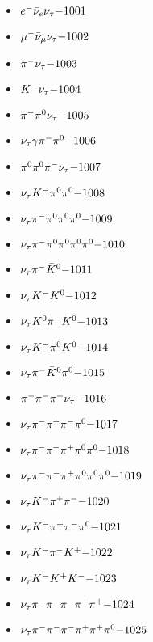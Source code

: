 
 \begin{multicols}{3} 
 \begin{itemize}
 \item $ e^{-} \bar{\nu}_{e} \nu_{\tau} \hfill{-1001}$
 \item $ \mu^{-} \bar{\nu}_{\mu} \nu_{\tau} \hfill{-1002}$
 \item $ \pi^{-} \nu_{\tau} \hfill{-1003}$
 \item $ K^{-} \nu_{\tau} \hfill{-1004}$
 \item $ \pi^{-} \pi^{0} \nu_{\tau} \hfill{-1005}$
 \item $ \nu_{\tau} \gamma \pi^{-} \pi^{0} \hfill{-1006}$
 \item $ \pi^{0} \pi^{0} \pi^{-} \nu_{\tau} \hfill{-1007}$
 \item $ \nu_{\tau} K^{-} \pi^{0} \pi^{0} \hfill{-1008}$
 \item $ \nu_{\tau} \pi^{-} \pi^{0} \pi^{0} \pi^{0} \hfill{-1009}$
 \item $ \nu_{\tau} \pi^{-} \pi^{0} \pi^{0} \pi^{0} \pi^{0} \hfill{-1010}$
 \item $ \nu_{\tau} \pi^{-} \bar{K}^{0} \hfill{-1011}$
 \item $ \nu_{\tau} K^{-} K^{0} \hfill{-1012}$
 \item $ \nu_{\tau} K^{0} \pi^{-} \bar{K}^{0} \hfill{-1013}$
 \item $ \nu_{\tau} K^{-} \pi^{0} K^{0} \hfill{-1014}$
 \item $ \nu_{\tau} \pi^{-} \bar{K}^{0} \pi^{0} \hfill{-1015}$
 \item $ \pi^{-} \pi^{-} \pi^{+} \nu_{\tau} \hfill{-1016}$
 \item $ \nu_{\tau} \pi^{-} \pi^{+} \pi^{-} \pi^{0} \hfill{-1017}$
 \item $ \nu_{\tau} \pi^{-} \pi^{-} \pi^{+} \pi^{0} \pi^{0} \hfill{-1018}$
 \item $ \nu_{\tau} \pi^{-} \pi^{-} \pi^{+} \pi^{0} \pi^{0} \pi^{0} \hfill{-1019}$
 \item $ \nu_{\tau} K^{-} \pi^{+} \pi^{-} \hfill{-1020}$
 \item $ \nu_{\tau} K^{-} \pi^{+} \pi^{-} \pi^{0} \hfill{-1021}$
 \item $ \nu_{\tau} K^{-} \pi^{-} K^{+} \hfill{-1022}$
 \item $ \nu_{\tau} K^{-} K^{+} K^{-} \hfill{-1023}$
 \item $ \nu_{\tau} \pi^{-} \pi^{-} \pi^{-} \pi^{+} \pi^{+} \hfill{-1024}$
 \item $ \nu_{\tau} \pi^{-} \pi^{-} \pi^{-} \pi^{+} \pi^{+} \pi^{0} \hfill{-1025}$

\end{itemize}
\end{multicols}
